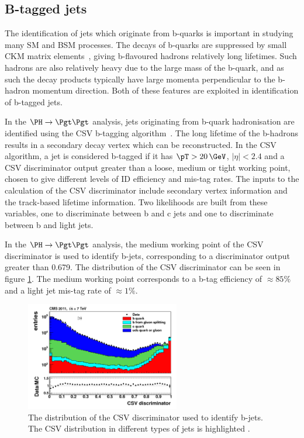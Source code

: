 \subsection{B-tagged jets}
\label{sec:btag}

The identification of jets which originate from b-quarks is important in
studying many
\ac{SM} and \ac{BSM} processes. The decays of b-quarks
are suppressed by small CKM matrix elements~\cite{PDG}, giving b-flavoured hadrons relatively
long lifetimes. Such hadrons are also relatively heavy due to the large mass of
the b-quark, and as such the decay products typically have large momenta
perpendicular to the b-hadron momentum direction. Both of these features are
exploited in identification of b-tagged jets.

In the $\PH \to \Pgt\Pgt$ analysis, jets originating from b-quark
hadronisation are identified using the \ac{CSV} b-tagging
algorithm~\cite{bjets}. The long lifetime of the b-hadrons results in a
secondary decay vertex which can be reconstructed. In the \ac{CSV} algorithm, a
jet is considered b-tagged if it has $\pT>20\,\GeV$, $|\eta|<2.4$ and a
\ac{CSV} discriminator output greater than a loose, medium or tight working
point, chosen to give different levels of ID efficiency and mis-tag rates. The
inputs to the calculation of the \ac{CSV} discriminator include secondary
vertex information and the track-based lifetime information. Two likelihoods are
built from these variables, one to discriminate between b and c jets and one to
discriminate between b and light jets. 

In the $\PH\to\Pgt\Pgt$ analysis, the medium working point of the \ac{CSV}
discriminator is used to identify b-jets, corresponding to a discriminator
output greater than 0.679. The distribution of the \ac{CSV} discriminator 
can be seen in figure \ref{fig:csv}. The medium working point corresponds to a
b-tag efficiency of $\approx 85\%$ and a light jet mis-tag rate of $\approx 1\%$. 

\begin{figure}
\begin{center}
    \includegraphics[width=0.6\textwidth]
      {plots/reco/csv.png}
\end{center}
\caption[The distribution of the CSV discriminator used to identify b-jets.]{
The distribution of the \ac{CSV} discriminator used to identify b-jets. The
\ac{CSV} distribution in different types of jets is highlighted \cite{bjets}.     
}
\label{fig:csv}
\end{figure}


